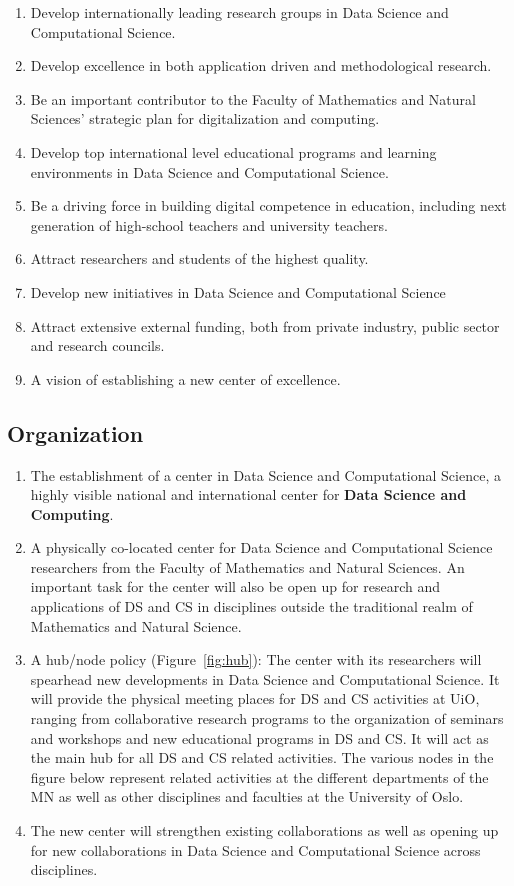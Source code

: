 \documentclass[a4paper,10pt]{article}
\begin{document}
\begin{enumerate} 
\item Develop internationally leading research groups in Data Science and Computational Science.
\item Develop excellence in both application driven and methodological research.
\item Be an important contributor to the Faculty of Mathematics and Natural Sciences' strategic plan for digitalization and computing. 
\item Develop top international level educational programs and learning environments in Data Science and Computational Science.
\item Be a driving force in building digital competence in education, including next generation of high-school teachers and university teachers.
\item Attract researchers and students of the highest quality.
\item Develop new initiatives in Data Science and Computational  Science
\item Attract extensive external funding, both from private industry, public sector and research councils.
\item A vision of establishing a new center of excellence.
\end{enumerate}

\subsection{Organization}
\begin{enumerate}
\item The establishment  of a center in Data Science and Computational Science, a highly visible  national and international center for {\bf Data Science and Computing}.\
\item A physically co-located center for Data Science and Computational Science researchers from the Faculty of Mathematics and Natural Sciences. An important task for the center will also be open up for research and applications of DS and CS in disciplines outside the traditional realm of Mathematics and Natural Science.
\item A hub/node policy (Figure~\ref{fig:hub}): The center with its researchers will spearhead new developments in Data Science and Computational Science. It will  provide the physical meeting places for DS and CS activities at UiO, ranging from collaborative research programs to the organization of seminars and workshops and new educational programs in DS and CS. It will act as the main hub for all DS and CS related activities. The various nodes in the figure below represent  related activities at the different departments of the MN as well as other disciplines and faculties at the University of Oslo. 
\item The new center will strengthen  existing collaborations as well as opening up for new  collaborations in Data Science and Computational Science across disciplines.  
\end{enumerate}
\end{document}
